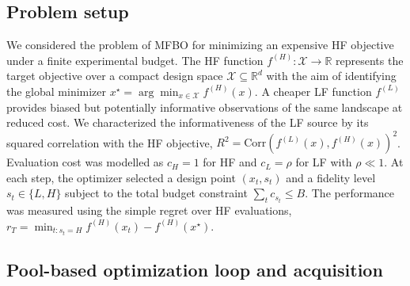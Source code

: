 \documentclass[11pt,a4paper]{article}%
\begin{document}
\subsection{Problem setup}\label{sec:meth-setup}

We considered the problem of MFBO for minimizing an expensive
HF objective under a finite experimental budget.  The HF
function $f^{(H)} : \mathcal{X} \to \mathbb{R}$ represents the target objective over a compact design space $\mathcal{X} \subseteq \mathbb{R}^d$ with the aim of identifying the global minimizer $x^\star = \arg\min_{x \in \mathcal{X}} f^{(H)}(x)$. A
cheaper LF function $f^{(L)}$ provides biased but potentially informative observations of the same landscape at reduced cost. We characterized the informativeness of the LF source by its squared correlation with the HF objective, $R^2 =
\mathrm{Corr}(f^{(L)}(x), f^{(H)}(x))^2$. Evaluation cost was modelled as $c_H = 1$ for
HF and $c_L = \rho$ for LF with $\rho \ll 1$. At each step, the optimizer selected a design point 
$(x_t, s_t)$ and a fidelity level $s_t \in \{L, H\}$ subject to the total budget constraint $\sum_t c_{s_t} \le B$. The 
performance was measured using the simple regret over HF evaluations, $r_T = \min_{t:
s_t = H} f^{(H)}(x_t) - f^{(H)}(x^\star)$.

\subsection{Pool-based optimization loop and acquisition}\label{sec:meth-loop}
\end{document}
